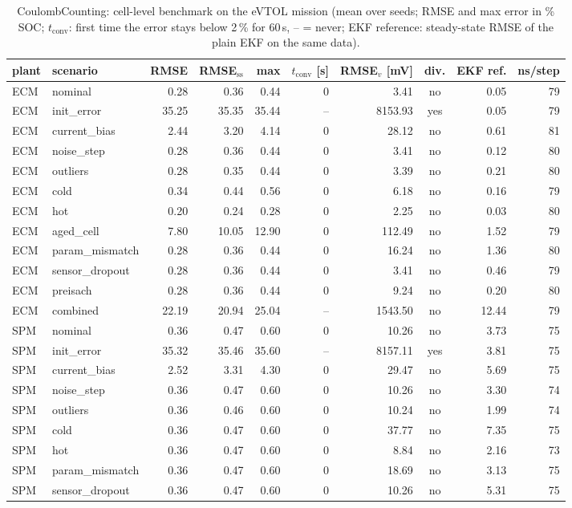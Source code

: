 \begin{table}[H]\centering\footnotesize\setlength{\tabcolsep}{4pt}
\caption{CoulombCounting: cell-level benchmark on the eVTOL mission (mean over seeds; RMSE and max error in \% SOC; $t_\mathrm{conv}$: first time the error stays below 2\,\% for 60\,s, -- = never; EKF reference: steady-state RMSE of the plain EKF on the same data).}\label{tab:cell_CoulombCounting}
\begin{tabular}{llrrrrrcrr}\toprule
plant & scenario & RMSE & RMSE$_\mathrm{ss}$ & max & $t_\mathrm{conv}$ [s] & RMSE$_v$ [mV] & div. & EKF ref. & ns/step \\ \midrule
ECM & nominal & 0.28 & 0.36 & 0.44 & 0 & 3.41 & no & 0.05 & 79 \\
ECM & init\_error & 35.25 & 35.35 & 35.44 & -- & 8153.93 & yes & 0.05 & 79 \\
ECM & current\_bias & 2.44 & 3.20 & 4.14 & 0 & 28.12 & no & 0.61 & 81 \\
ECM & noise\_step & 0.28 & 0.36 & 0.44 & 0 & 3.41 & no & 0.12 & 80 \\
ECM & outliers & 0.28 & 0.35 & 0.44 & 0 & 3.39 & no & 0.21 & 80 \\
ECM & cold & 0.34 & 0.44 & 0.56 & 0 & 6.18 & no & 0.16 & 79 \\
ECM & hot & 0.20 & 0.24 & 0.28 & 0 & 2.25 & no & 0.03 & 80 \\
ECM & aged\_cell & 7.80 & 10.05 & 12.90 & 0 & 112.49 & no & 1.52 & 79 \\
ECM & param\_mismatch & 0.28 & 0.36 & 0.44 & 0 & 16.24 & no & 1.36 & 80 \\
ECM & sensor\_dropout & 0.28 & 0.36 & 0.44 & 0 & 3.41 & no & 0.46 & 79 \\
ECM & preisach & 0.28 & 0.36 & 0.44 & 0 & 9.24 & no & 0.20 & 80 \\
ECM & combined & 22.19 & 20.94 & 25.04 & -- & 1543.50 & no & 12.44 & 79 \\
\midrule
SPM & nominal & 0.36 & 0.47 & 0.60 & 0 & 10.26 & no & 3.73 & 75 \\
SPM & init\_error & 35.32 & 35.46 & 35.60 & -- & 8157.11 & yes & 3.81 & 75 \\
SPM & current\_bias & 2.52 & 3.31 & 4.30 & 0 & 29.47 & no & 5.69 & 75 \\
SPM & noise\_step & 0.36 & 0.47 & 0.60 & 0 & 10.26 & no & 3.30 & 74 \\
SPM & outliers & 0.36 & 0.46 & 0.60 & 0 & 10.24 & no & 1.99 & 74 \\
SPM & cold & 0.36 & 0.47 & 0.60 & 0 & 37.77 & no & 7.35 & 75 \\
SPM & hot & 0.36 & 0.47 & 0.60 & 0 & 8.84 & no & 2.16 & 73 \\
SPM & param\_mismatch & 0.36 & 0.47 & 0.60 & 0 & 18.69 & no & 3.13 & 75 \\
SPM & sensor\_dropout & 0.36 & 0.47 & 0.60 & 0 & 10.26 & no & 5.31 & 75 \\
\bottomrule\end{tabular}\end{table}

